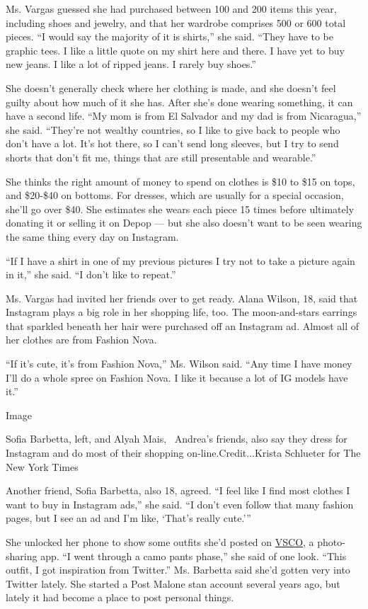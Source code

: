 Ms. Vargas guessed she had purchased between 100 and 200 items this
year, including shoes and jewelry, and that her wardrobe comprises 500
or 600 total pieces. ``I would say the majority of it is shirts,'' she
said. ``They have to be graphic tees. I like a little quote on my shirt
here and there. I have yet to buy new jeans. I like a lot of ripped
jeans. I rarely buy shoes.''

She doesn't generally check where her clothing is made, and she doesn't
feel guilty about how much of it she has. After she's done wearing
something, it can have a second life. ``My mom is from El Salvador and
my dad is from Nicaragua,'' she said. ``They're not wealthy countries,
so I like to give back to people who don't have a lot. It's hot there,
so I can't send long sleeves, but I try to send shorts that don't fit
me, things that are still presentable and wearable.''

She thinks the right amount of money to spend on clothes is \$10 to \$15
on tops, and \$20-\$40 on bottoms. For dresses, which are usually for a
special occasion, she'll go over \$40. She estimates she wears each
piece 15 times before ultimately donating it or selling it on Depop ---
but she also doesn't want to be seen wearing the same thing every day on
Instagram.

``If I have a shirt in one of my previous pictures I try not to take a
picture again in it,'' she said. ``I don't like to repeat.''

Ms. Vargas had invited her friends over to get ready. Alana Wilson, 18,
said that Instagram plays a big role in her shopping life, too. The
moon-and-stars earrings that sparkled beneath her hair were purchased
off an Instagram ad. Almost all of her clothes are from Fashion Nova.

``If it's cute, it's from Fashion Nova,'' Ms. Wilson said. ``Any time I
have money I'll do a whole spree on Fashion Nova. I like it because a
lot of IG models have it.''

Image

Sofia Barbetta, left, and Alyah Mais,~ Andrea's friends, also say they
dress for Instagram and do most of their shopping
on-line.Credit...Krista Schlueter for The New York Times

Another friend, Sofia Barbetta, also 18, agreed. ``I feel like I find
most clothes I want to buy in Instagram ads,'' she said. ``I don't even
follow that many fashion pages, but I see an ad and I'm like, `That's
really cute.'''

She unlocked her phone to show some outfits she'd posted on
\href{https://www.nytimes3xbfgragh.onion/2019/08/30/style/vsco-girls.html}{VSCO},
a photo-sharing app. ``I went through a camo pants phase,'' she said of
one look. ``This outfit, I got inspiration from Twitter.'' Ms. Barbetta
said she'd gotten very into Twitter lately. She started a Post Malone
stan account several years ago, but lately it had become a place to post
personal things.

